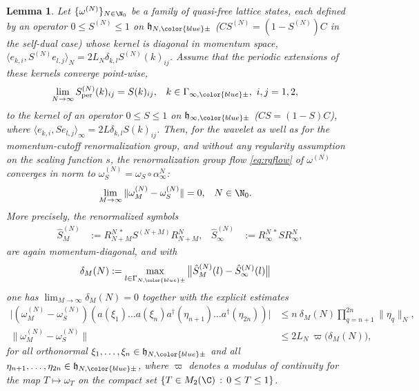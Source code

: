 \documentclass[a4paper, 11pt]{article}
\newcommand{\fh}{\mathfrak{h}}
\DeclareMathOperator{\1}{\mathds{1}}
\DeclareMathOperator{\per}{per}
\newtheorem{lemma}[thm]{Lemma}
\begin{document}
\begin{lemma}
\label{lem:stateconv}
Let $\{\omega^{(N)}\}_{N\in\N_{0}}$ be a family of quasi-free lattice states, each defined by an operator $0\leq S^{(N)}\leq1$ on $\fh_{N,{\color{blue}\pm}}$ ($CS^{(N)} = (1-S^{(N)})C$ in the self-dual case) whose kernel is diagonal in momentum space, $\langle e_{k,i}, S^{(N)}e_{l,j}\rangle_{N} = 2L_{N}\delta_{k,l}S^{(N)}(k)_{ij}$. Assume that the periodic extensions of these kernels converge point-wise,
\begin{align}
\label{eq:kernelpointlim}
\lim_{N\rightarrow\infty}S^{(N)}_{\per}(k)_{ij} & = S(k)_{ij}, & k & \in\Gamma_{\infty,{\color{blue}\pm}},\ i,j=1,2,
\end{align}
to the kernel of an operator $0\leq S\leq1$ on $\fh_{\infty,{\color{blue}\pm}}$ ($CS = (1-S)C$), where $\langle e_{k,i}, Se_{l,j}\rangle_{\infty}= 2L\delta_{k,l}S(k)_{ij}$. Then, for the wavelet as well as for the momentum-cutoff renormalization group, and \emph{without any regularity assumption on the scaling function $s$}, the renormalization group flow \eqref{eq:rgflow} of $\omega^{(N)}$ converges in norm to $\omega^{(N)}_{S} = \omega_{S}\circ\alpha^{N}_{\infty}$:
\begin{align}
\label{eq:2pconvnorm}
\lim_{M\rightarrow\infty}\|\omega^{(N)}_{M}-\omega^{(N)}_{S}\| & = 0, & N & \in\N_{0}.
\end{align}
More precisely, the renormalized symbols
\begin{align}
\label{eq:pulledbacksymbols}
\hat{S}^{(N)}_{M} & := R^{N\!\ *}_{N+M}S^{(N+M)}R^{N}_{N+M}, & \hat{S}^{(N)}_{\infty} & := R^{N\!\ *}_{\infty}SR^{N}_{\infty},
\end{align}
are again momentum-diagonal, and with
\begin{align}
\label{eq:symboldist}
\delta_{M}(N) & := \max_{l\in\Gamma_{N,{\color{blue}\pm}}}\big\|\hat{S}^{(N)}_{M}(l)-\hat{S}^{(N)}_{\infty}(l)\big\|
\end{align}
one has $\lim_{M\rightarrow\infty}\delta_{M}(N) = 0$ together with the explicit estimates
\begin{align}
\label{eq:2pconvmono}
\big|(\omega^{(N)}_{M}-\omega^{(N)}_{S})(a(\xi_{1})\dots a(\xi_{n})a^{\dag}(\eta_{n+1})\dots a^{\dag}(\eta_{2n}))\big| & \leq n\!\ \delta_{M}(N)\prod_{q=n+1}^{2n}\|\eta_{q}\|_{N}, \\
\label{eq:2pconvnormquant}
\|\omega^{(N)}_{M}-\omega^{(N)}_{S}\| & \leq 2L_{N}\!\ \varpi\big(\delta_{M}(N)\big),
\end{align}
for all orthonormal $\xi_{1},\dots,\xi_{n}\in\fh_{N,{\color{blue}\pm}}$ and all $\eta_{n+1},\dots,\eta_{2n}\in\fh_{N,{\color{blue}\pm}}$, where $\varpi$ denotes a modulus of continuity for the map $T\mapsto\omega_{T}$ on the compact set $\{T\in M_{2}(\C)\!\ :\!\ 0\leq T\leq1\}$.
\end{lemma}
\end{document}
